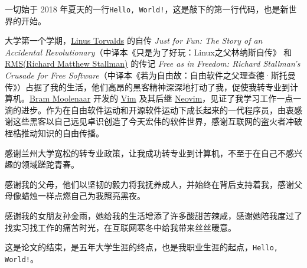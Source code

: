 \documentclass[AutoFakeBold]{LZUThesis}
\begin{document}
\begin{sloppypar}
\Thanks

一切始于 2018 年夏天的一行\texttt{Hello, World!}，这是敲下的第一行代码，也是新世界的开始。

大学第一个学期，\hyperlink{https://linuxtorvalds.com/}{Linus Torvalds} 的自传 \textit{Just for Fun: The Story of an Accidental Revolutionary}（中译本《只是为了好玩：Linux之父林纳斯自传》 和 \hyperlink{https://stallman.org/}{RMS(Richard Matthew Stallman)} 的传记 \textit{Free as in Freedom: Richard Stallman's Crusade for Free Software}（中译本《若为自由故：自由软件之父理查德·斯托曼传》）占据了我的生活，他们高昂的黑客精神深深地打动了我，促使我转专业到计算机。\hyperlink{https://www.moolenaar.net/}{Bram Moolenaar} 开发的 \hyperlink{https://www.vim.org/}{Vim} 及其后继 \hyperlink{https://neovim.io/}{Neovim}，见证了我学习工作一点一滴的进步。作为在自由软件运动和开源软件运动下成长起来的一代程序员，由衷感谢这些黑客以自己远见卓识创造了今天宏伟的软件世界，感谢互联网的盗火者冲破桎梏推动知识的自由传播。

感谢兰州大学宽松的转专业政策，让我成功转专业到计算机，不至于在自己不感兴趣的领域蹉跎青春。

感谢我的父母，他们以坚韧的毅力将我抚养成人，并始终在背后支持着我，感谢父母像蜡烛一样点燃自己为我照亮黑夜。

感谢我的女朋友孙金雨，她给我的生活增添了许多酸甜苦辣咸，感谢她陪我度过了找实习找工作的痛苦时光，在互联网寒冬中给我带来丝丝暖意。

这是论文的结束，是五年大学生涯的终点，也是我职业生涯的起点，\texttt{Hello, World!}。

\Grade %

\end{sloppypar}
\end{document}
